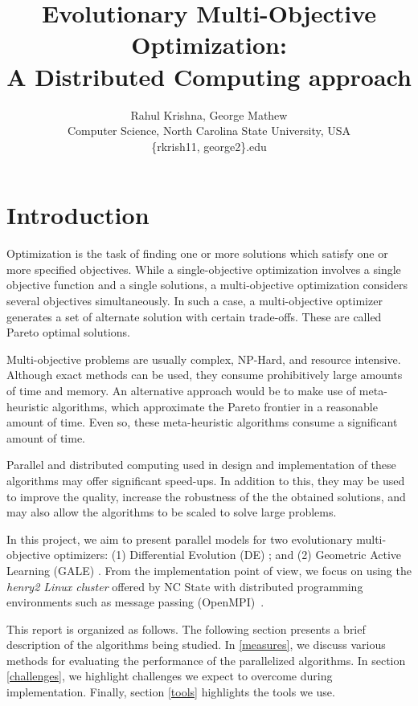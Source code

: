 \documentclass[conference]{IEEEtran}
\author{Rahul Krishna, George Mathew\\
	Computer Science, North Carolina State University, USA\\
	\{rkrish11, george2\}\@ncsu.edu
}
\title{Evolutionary Multi-Objective Optimization:\\ A Distributed Computing approach}
\begin{document}
	\maketitle
	\begin{abstract}

	\end{abstract}
	\begin{IEEEkeywords}

	\end{IEEEkeywords}
	
	\section{Introduction} 
Optimization is the task of finding one or more solutions which satisfy one or more specified objectives. While a single-objective optimization involves a single objective function and a single solutions, a multi-objective optimization considers several objectives simultaneously. In such a  case, a multi-objective optimizer generates a set of alternate solution with certain trade-offs. These are called Pareto optimal solutions.

Multi-objective problems are usually complex, NP-Hard, and resource intensive. Although exact methods can be used, they consume prohibitively large amounts of time and memory. An alternative approach would be to make use of meta-heuristic algorithms, which approximate the Pareto frontier in a reasonable amount of time. Even so, these meta-heuristic algorithms consume a significant amount of time. 

Parallel and distributed computing used in design and implementation of these algorithms may offer significant speed-ups. In addition to this, they may be used to improve the quality, increase the robustness of the the obtained solutions, and may also allow the algorithms to be scaled to solve large problems. 

In this project, we aim to present parallel models for two evolutionary multi-objective optimizers: (1) Differential Evolution (DE) \cite{storn97}; and (2) Geometric Active Learning (GALE) \cite{krall15}. From the implementation point of view, we focus on using the \textit{henry2 Linux cluster} offered by NC State with distributed programming environments such as message passing (OpenMPI)~\cite{openMPI04}.

This report is organized as follows. The following section presents a brief description of the algorithms being studied. In \textsection\ref{measures}, we discuss various methods for evaluating the performance of the parallelized algorithms. In section \textsection\ref{challenges}, we highlight challenges we expect to overcome during implementation. Finally, section \textsection\ref{tools} highlights the tools we use.
\end{document}
